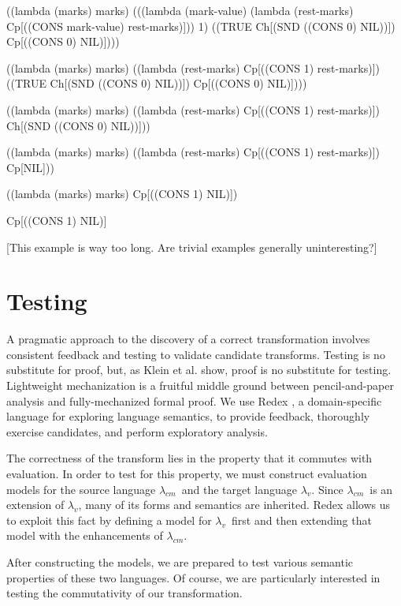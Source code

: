 \documentclass{llncs}
\newcommand{\cm}[0]{$\lambda_{cm}$}
\newcommand{\lv}[0]{$\lambda_v$}
\begin{document}
\begin{schemedisplay}
((lambda (marks) marks)
 (((lambda (mark-value) (lambda (rest-marks) Cp[((CONS mark-value) rest-marks)]))
   1)
  ((TRUE Ch[(SND ((CONS 0) NIL))]) Cp[((CONS 0) NIL)])))

((lambda (marks) marks)
 ((lambda (rest-marks) Cp[((CONS 1) rest-marks)])
  ((TRUE Ch[(SND ((CONS 0) NIL))]) Cp[((CONS 0) NIL)])))

((lambda (marks) marks)
 ((lambda (rest-marks) Cp[((CONS 1) rest-marks)])
  Ch[(SND ((CONS 0) NIL))]))

((lambda (marks) marks)
 ((lambda (rest-marks) Cp[((CONS 1) rest-marks)])
  Cp[NIL]))

((lambda (marks) marks)
 Cp[((CONS 1) NIL)])

Cp[((CONS 1) NIL)]
\end{schemedisplay}

[This example is way too long. Are trivial examples generally uninteresting?]

\section{Testing}
\label{sec-testing}

A pragmatic approach to the discovery of a correct transformation involves consistent feedback and testing to validate candidate transforms. Testing is no substitute for proof, but, as Klein et al. \cite{klein2012run} show, proof is no substitute for testing. Lightweight mechanization is a fruitful middle ground between pencil-and-paper analysis and fully-mechanized formal proof. We use Redex \cite{findler2010redex}, a domain-specific language for exploring language semantics, to provide feedback, thoroughly exercise candidates, and perform exploratory analysis.

The correctness of the transform lies in the property that it commutes with evaluation. In order to test for this property, we must construct evaluation models for the source language \cm\ and the target language \lv. Since \cm\ is an extension of \lv, many of its forms and semantics are inherited. Redex allows us to exploit this fact by defining a model for \lv\ first and then extending that model with the enhancements of \cm.

After constructing the models, we are prepared to test various semantic properties of these two languages. Of course, we are particularly interested in testing the commutativity of our transformation.

\end{document}
